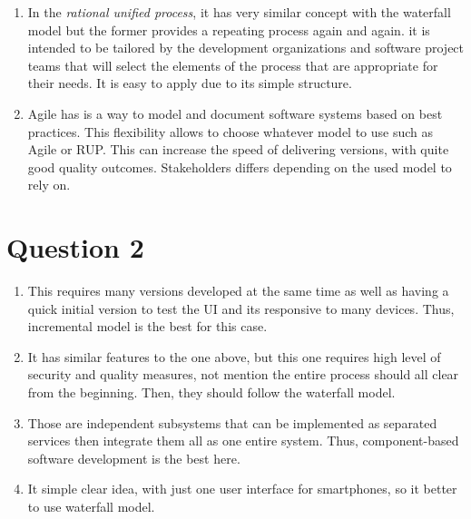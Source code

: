 \documentclass{article}
\begin{document}
\begin{enumerate}[label=\alph*.]
  \item In the \textit{rational unified process}, it has very similar concept with the waterfall
        model but the former provides a repeating process again and again. it is intended to be tailored by the
        development organizations and software project teams that will select the elements of the process
        that are appropriate for their needs. It is easy to apply due to its simple structure.


  \item Agile has is a way to model and document software systems based on best practices. This flexibility
        allows to choose whatever model to use such as Agile or RUP. This can increase the speed of
        delivering versions, with quite good quality outcomes. Stakeholders differs depending on the used
        model to rely on.

\end{enumerate}


\section*{Question 2}
\begin{enumerate}
  \item This requires many versions developed at the same time as well as having a quick initial version
        to test the UI and its responsive to many devices. Thus, incremental model is the best for this
        case.

  \item It has similar features to the one above, but this one requires high level of security and quality
        measures, not mention the entire process should all clear from the beginning. Then, they should
        follow the waterfall model.

  \item Those are independent subsystems that can be implemented as separated services then integrate them all
        as one entire system. Thus, component-based software development is the best here.

  \item It simple clear idea, with just one user interface for smartphones, so it better to use waterfall model.

\end{enumerate}
\end{document}
